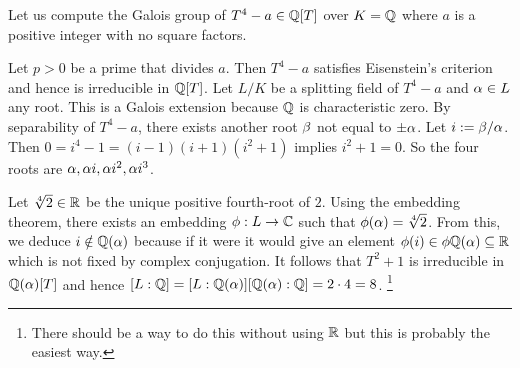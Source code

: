 \documentclass{article}
\begin{document}
\begin{eg}
  
  Let us compute the Galois group of 
  $T^4 - a \in \mathbb{Q}[T]$ over $K = \mathbb{Q}$ where 
  $a$ is a positive integer with no square factors.
  
  Let $p > 0$ be a prime that divides $a$.
  Then $T^4 - a$ satisfies Eisenstein's criterion and hence is
  irreducible in $\mathbb{Q}[T]$.
  Let $L / K$ be a splitting field of $T^4 - a$
  and $\alpha \in L$ any root.
  This is a Galois extension because $\mathbb{Q}$ is characteristic zero.
  By separability of $T^4 - a$,
  there exists another root $\beta$ not equal to $\pm \alpha$.
  Let $i := \beta / \alpha$.
  Then $0 = i^4 - 1 = (i - 1)(i + 1)
  (i^2 + 1)$
  implies $i^2 + 1 = 0$.
  So the four roots are $\alpha , \alpha i , \alpha i^2 , \alpha i^3$.

  Let $\sqrt[4]{2} \in \mathbb{R}$ be the unique positive fourth-root of $2$.
  Using the embedding theorem,
  there exists an embedding $\phi : L \to \mathbb{C}$
  such that $\phi(\alpha) = \sqrt[4]{2}$.
  From this, we deduce $i \notin \mathbb{Q}(\alpha)$ because
  if it were it would give an element $\phi(i) \in \phi \mathbb{Q}(\alpha) \subseteq \mathbb{R}$
  which is not fixed by complex conjugation.
  It follows that $T^2 + 1$ is irreducible in $\mathbb{Q}(\alpha)[T]$
  and hence $[L : \mathbb{Q}] = [L : \mathbb{Q}(\alpha)] [\mathbb{Q}(\alpha) : \mathbb{Q}] = 2 \cdot 4 = 8$.
  \footnote{
    There should be a way to do this without using $\mathbb{R}$ but
    this is probably the easiest way.
  }


\end{eg}
\end{document}
